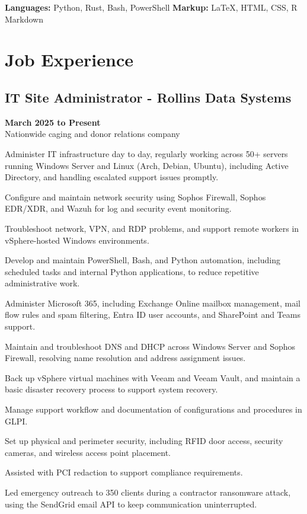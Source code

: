 \documentclass{article}
\begin{document}
\noindent\textbf{Languages:} Python, Rust, Bash, PowerShell \quad \textbf{Markup:} LaTeX, HTML, CSS, R Markdown

\section{Job Experience}

\subsection{IT Site Administrator - Rollins Data Systems}
\textbf{March 2025 to Present} \\
Nationwide caging and donor relations company
\begin{compactitem}
	\item Administer IT infrastructure day to day, regularly working across 50+ servers running Windows Server and Linux (Arch, Debian, Ubuntu), including Active Directory, and handling escalated support issues promptly.
	\item Configure and maintain network security using Sophos Firewall, Sophos EDR/XDR, and Wazuh for log and security event monitoring.
	\item Troubleshoot network, VPN, and RDP problems, and support remote workers in vSphere-hosted Windows environments.
	\item Develop and maintain PowerShell, Bash, and Python automation, including scheduled tasks and internal Python applications, to reduce repetitive administrative work.
	\item Administer Microsoft 365, including Exchange Online mailbox management, mail flow rules and spam filtering, Entra ID user accounts, and SharePoint and Teams support.
	\item Maintain and troubleshoot DNS and DHCP across Windows Server and Sophos Firewall, resolving name resolution and address assignment issues.
	\item Back up vSphere virtual machines with Veeam and Veeam Vault, and maintain a basic disaster recovery process to support system recovery.
	\item Manage support workflow and documentation of configurations and procedures in GLPI.
	\item Set up physical and perimeter security, including RFID door access, security cameras, and wireless access point placement.
	\item Assisted with PCI redaction to support compliance requirements.
	\item Led emergency outreach to 350 clients during a contractor ransomware attack, using the SendGrid email API to keep communication uninterrupted.
\end{compactitem}
\end{document}
